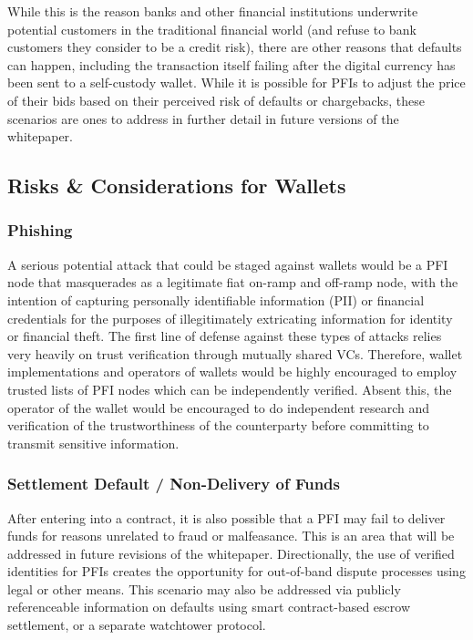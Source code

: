 \documentclass[11pt]{article}
\begin{document}
\vspace{1\baselineskip}
While this is the reason banks and other financial institutions underwrite potential customers in the traditional financial world (and refuse to bank customers they consider to be a credit risk), there are other reasons that defaults can happen, including the transaction itself failing after the digital currency has been sent to a self-custody wallet. While it is possible for PFIs to adjust the price of their bids based on their perceived risk of defaults or chargebacks, these scenarios are ones to address in further detail in future versions of the whitepaper. 

\vspace{1\baselineskip}
\subsection{Risks & Considerations for Wallets}

\subsubsection{Phishing}

A serious potential attack that could be staged against wallets would be a PFI node that masquerades as a legitimate fiat on-ramp and off-ramp node, with the intention of capturing personally identifiable information (PII) or financial credentials for the purposes of illegitimately extricating information for identity or financial theft. The first line of defense against these types of attacks relies very heavily on trust verification through mutually shared VCs. Therefore, wallet implementations and operators of wallets would be highly encouraged to employ trusted lists of PFI nodes which can be independently verified. Absent this, the operator of the wallet would be encouraged to do independent research and verification of the trustworthiness of the counterparty before committing to transmit sensitive information. 

\subsubsection{Settlement Default / Non-Delivery of Funds}

After entering into a contract, it is also possible that a PFI may fail to deliver funds for reasons unrelated to fraud or malfeasance. This is an area that will be addressed in future revisions of the whitepaper. Directionally, the use of verified identities for PFIs creates the opportunity for out-of-band dispute processes using legal or other means. This scenario may also be addressed via publicly referenceable information on defaults using smart contract-based escrow settlement, or a separate watchtower protocol. \ \ \ \ \ \ \ \ \ \ \ \ \ \ \ \ \ \ \ \ \ \ \ \ \ \ \ \ \ \ \ \ \ \ \ \ \ \ \ \ \ \ \ \ \ \ \ \ \ \ 
\end{document}
